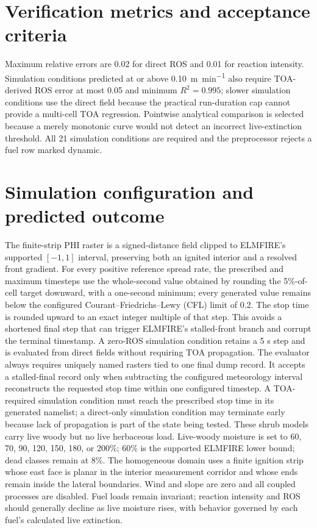 \section{Verification metrics and acceptance criteria}
Maximum relative errors are 0.02 for direct ROS and 0.01 for reaction intensity.  Simulation conditions predicted at or above \SI{0.10}{m.min^{-1}} also require TOA-derived ROS error at most 0.05 and minimum $R^2=0.995$; slower simulation conditions use the direct field because the practical run-duration cap cannot provide a multi-cell TOA regression.  Pointwise analytical comparison is selected because a merely monotonic curve would not detect an incorrect live-extinction threshold.  All 21 simulation conditions are required and the preprocessor rejects a fuel row marked dynamic.

\section{Simulation configuration and predicted outcome}

The finite-strip PHI raster is a signed-distance field clipped to ELMFIRE's supported $[-1,1]$ interval, preserving both an ignited interior and a resolved front gradient. For every positive reference spread rate, the prescribed and maximum timesteps use the whole-second value obtained by rounding the 5\%-of-cell target downward, with a one-second minimum; every generated value remains below the configured Courant--Friedrichs--Lewy (CFL) limit of 0.2. The stop time is rounded upward to an exact integer multiple of that step. This avoids a shortened final step that can trigger ELMFIRE's stalled-front branch and corrupt the terminal timestamp. A zero-ROS simulation condition retains a 5 s step and is evaluated from direct fields without requiring TOA propagation. The evaluator always requires uniquely named rasters tied to one final dump record. It accepts a stalled-final record only when subtracting the configured meteorology interval reconstructs the requested stop time within one configured timestep. A TOA-required simulation condition must reach the prescribed stop time in its generated namelist; a direct-only simulation condition may terminate early because lack of propagation is part of the state being tested.
These shrub models carry live woody but no live herbaceous load. Live-woody moisture is set to 60, 70, 90, 120, 150, 180, or 200\%; 60\% is the supported ELMFIRE lower bound; dead classes remain at 8\%.  The homogeneous domain uses a finite ignition strip whose east face is planar in the interior measurement corridor and whose ends remain inside the lateral boundaries.  Wind and slope are zero and all coupled processes are disabled.  Fuel loads remain invariant; reaction intensity and ROS should generally decline as live moisture rises, with behavior governed by each fuel's calculated live extinction.

